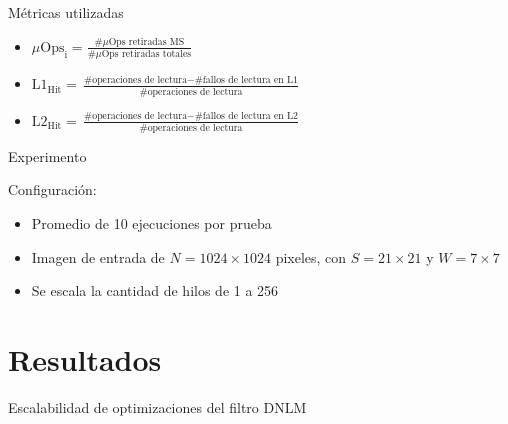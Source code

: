 \documentclass[15pt]{beamer} %
\begin{document}
	
	
\begin{frame}{Métricas utilizadas}
	\begin{itemize}
	\item $\mu\text{Ops}_{\text{i}}= \frac{\text{\#}\mu\text{Ops retiradas MS}}{\text{\#}\mu\text{Ops retiradas totales}}$
	\vspace*{4mm}
	\item $\text{L1}_{\text{Hit}} = \frac{\text{\# operaciones de lectura}-\text{\# fallos de lectura en L1}}{\text{\# operaciones de lectura}}$
	\vspace*{4mm}
	\item $\text{L2}_{\text{Hit}} = \frac{\text{\# operaciones de lectura}-\text{\# fallos de lectura en L2}}{\text{\# operaciones de lectura}}$
	\end{itemize}
\end{frame}
	
	

\begin{frame}{Experimento}

Configuración:
	\begin{itemize}
		\item Promedio de 10 ejecuciones por prueba
		\item Imagen de entrada de $N = 1024\times 1024$ pixeles, con $S = 21\times21$ y $W = 7\times7$
		\item Se escala la cantidad de hilos de 1 a 256
	\end{itemize}
	
	

\end{frame}

\section{Resultados}


\begin{frame}{Escalabilidad de optimizaciones del filtro DNLM}

	\begin{center}
	\end{center}
\end{frame}
\end{document}
